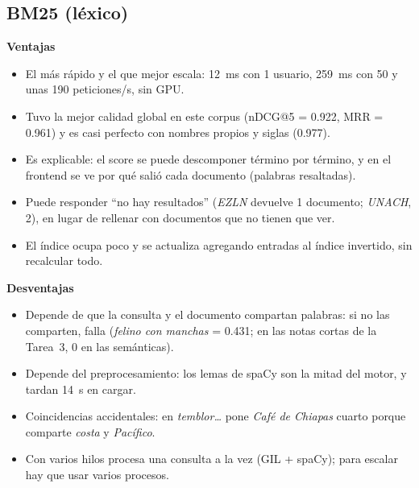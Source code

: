\documentclass[11pt,letterpaper]{article}
\begin{document}
\subsection*{BM25 (léxico)}
\textbf{Ventajas}
\begin{itemize}[nosep]
\item El más rápido y el que mejor escala: 12~ms con 1 usuario, 259~ms con 50 y unas 190 peticiones/s, sin GPU.
\item Tuvo la mejor calidad global en este corpus (nDCG@5 = 0.922, MRR = 0.961) y es casi perfecto con nombres propios y siglas (0.977).
\item Es explicable: el score se puede descomponer término por término, y en el frontend se ve por qué salió cada documento (palabras resaltadas).
\item Puede responder ``no hay resultados'' (\emph{EZLN} devuelve 1 documento; \emph{UNACH}, 2), en lugar de rellenar con documentos que no tienen que ver.
\item El índice ocupa poco y se actualiza agregando entradas al índice invertido, sin recalcular todo.
\end{itemize}
\textbf{Desventajas}
\begin{itemize}[nosep]
\item Depende de que la consulta y el documento compartan palabras: si no las comparten, falla (\emph{felino con manchas} = 0.431; en las notas cortas de la Tarea~3, 0 en las semánticas).
\item Depende del preprocesamiento: los lemas de spaCy son la mitad del motor, y tardan 14~s en cargar.
\item Coincidencias accidentales: en \emph{temblor\ldots} pone \emph{Café de Chiapas} cuarto porque comparte \emph{costa} y \emph{Pacífico}.
\item Con varios hilos procesa una consulta a la vez (GIL + spaCy); para escalar hay que usar varios procesos.
\end{itemize}
\end{document}
